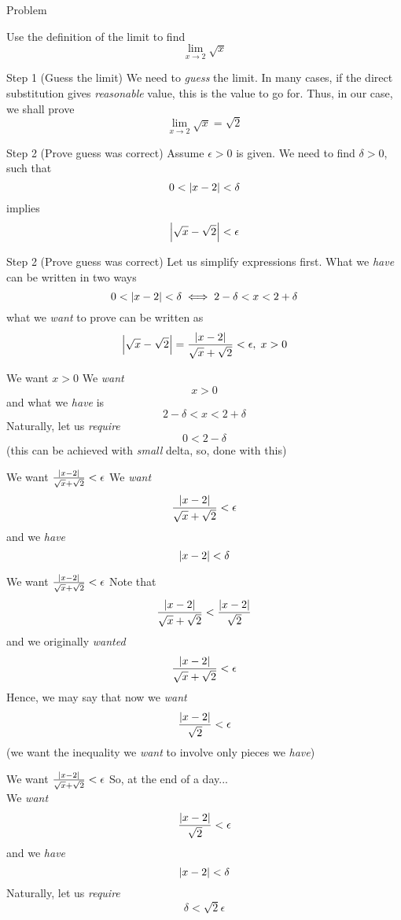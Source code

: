 \documentclass{beamer}
\begin{document}
\begin{frame}{Problem}
\begin{center}Use the definition of the limit to find \[\lim_{x\to 2}\sqrt{x}\]\end{center}
\end{frame}
\begin{frame}{Step 1 (Guess the limit)}
We need to \textit{guess} the limit. In many cases, if the direct substitution gives \textit{reasonable} value, this is the value to go for. Thus,
in our case, we shall prove
\[\lim_{x\to 2}\sqrt{x}=\sqrt{2}\]
\end{frame}
\begin{frame}{Step 2 (Prove guess was correct)}
Assume $\epsilon>0$ is given. We need to find $\delta>0$, such that \[0<\left|x-2\right|<\delta\] implies \[\left|\sqrt{x}-\sqrt{2}\right|<\epsilon\]
\end{frame}
\begin{frame}{Step 2 (Prove guess was correct)}
Let us simplify expressions first. What we \textit{have} can be written in two ways
\[0<\left|x-2\right|<\delta\iff 2-\delta<x<2+\delta\]
what we \textit{want} to prove can be written as
\[\left|\sqrt{x}-\sqrt{2}\right|=\frac{\left|x-2\right|}{\sqrt{x}+\sqrt{2}}<\epsilon,\;x>0\]
\end{frame}
\begin{frame}{We want $x>0$}
We \textit{want} \[x>0\] and what we \textit{have} is \[2-\delta<x<2+\delta\]
Naturally, let us \textit{require} \[0<2-\delta\] (this can be achieved with \textit{small} delta, so, done with this)
\end{frame}
\begin{frame}{We want $\frac{\left|x-2\right|}{\sqrt{x}+\sqrt{2}}<\epsilon$}
We \textit{want}
\[\frac{\left|x-2\right|}{\sqrt{x}+\sqrt{2}}<\epsilon\]
and we \textit{have} \[\left|x-2\right|<\delta\]
\end{frame}
\begin{frame}{We want $\frac{\left|x-2\right|}{\sqrt{x}+\sqrt{2}}<\epsilon$}
Note that
\[\frac{\left|x-2\right|}{\sqrt{x}+\sqrt{2}}<\frac{\left|x-2\right|}{\sqrt{2}}\]
and we originally \textit{wanted}
\[\frac{\left|x-2\right|}{\sqrt{x}+\sqrt{2}}<\epsilon\]
Hence, we may say that now we \textit{want}
\[\frac{\left|x-2\right|}{\sqrt{2}}<\epsilon\]
(we want the inequality we \textit{want} to involve only pieces we \textit{have})
\end{frame}
\begin{frame}{We want $\frac{\left|x-2\right|}{\sqrt{x}+\sqrt{2}}<\epsilon$}
So, at the end of a day...\\
We \textit{want}
\[\frac{\left|x-2\right|}{\sqrt{2}}<\epsilon\]
and we \textit{have}
\[\left|x-2\right|<\delta\]
Naturally, let us \textit{require}
\[\delta<\sqrt{2}\epsilon\]
\end{frame}
\end{document}

